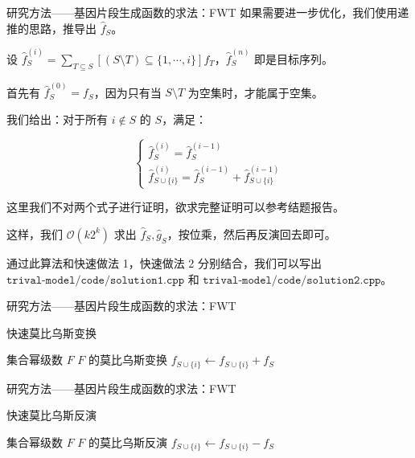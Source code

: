 \documentclass{beamer}
\begin{document}
	\begin{frame}{研究方法——基因片段生成函数的求法：FWT}
		如果需要进一步优化，我们使用递推的思路，推导出 $\hat f_S$。
		
		设 $\hat f_S^{(i)}=\sum_{T\subseteq S}[(S\setminus T)\subseteq\{1,\cdots,i\}]f_T$，$\hat f_S^{(n)}$ 即是目标序列。
		
		首先有 $\hat f_S^{(0)}=f_S$，因为只有当 $S \setminus T$ 为空集时，才能属于空集。
		
		我们给出：对于所有 $i\notin S$ 的 $S$，满足：
		
		$$
		\begin{cases}
			\hat f_S^{(i)}=\hat f_S^{(i-1)} \\
			\hat f_{S\cup\{i\}}^{(i)}=\hat f_S^{(i-1)}+\hat f_{S\cup\{i\}}^{(i-1)}
		\end{cases}
		$$
		
		这里我们不对两个式子进行证明，欲求完整证明可以参考结题报告。
		
		这样，我们 $\mathcal{O}(k2^k)$ 求出 $\hat f_S,\hat g_S$，按位乘，然后再反演回去即可。
		
		通过此算法和快速做法 1，快速做法 2 分别结合，我们可以写出 $\texttt{trival-model/code/solution1.cpp}$ 和 $\texttt{trival-model/code/solution2.cpp}$。
	\end{frame}

	\begin{frame}{研究方法——基因片段生成函数的求法：FWT}
		\begin{algorithm}[H]
			\caption{快速莫比乌斯变换}
			\begin{algorithmic}[1]
				\Require 集合幂级数 $F$
				\Ensure $F$ 的莫比乌斯变换
				\State $f_{S \cup \{i\}} \gets f_{S \cup \{i\}} + f_{S}$
				\EndFor
				\EndFor
				\State {}
				\EndFunction
			\end{algorithmic}
		\end{algorithm}
	\end{frame}

	\begin{frame}{研究方法——基因片段生成函数的求法：FWT}
		\begin{algorithm}[H]
			\caption{快速莫比乌斯反演}
			\begin{algorithmic}[1]
				\Require 集合幂级数 $F$
				\Ensure $F$ 的莫比乌斯反演
				\State $f_{S \cup \{i\}} \gets f_{S \cup \{i\}} - f_{S}$
				\EndFor
				\EndFor
				\State {}
				\EndFunction
			\end{algorithmic}
		\end{algorithm}
	\end{frame}
\end{document}
